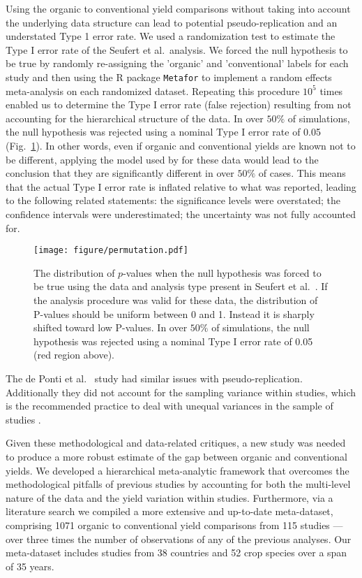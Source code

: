 \documentclass{article}\usepackage[]{graphicx}\usepackage[]{color}
\begin{document}
Using the organic to conventional yield comparisons without taking
into account the underlying data structure can lead to potential
pseudo-replication and an understated Type 1 error rate. We used a
randomization test to estimate the Type I error rate of the Seufert et
al.~analysis.  We forced the null hypothesis to be true by randomly
re-assigning the 'organic' and 'conventional' labels for each study
and then using the R package {\tt Metafor} \citep{metafor} to
implement a random effects meta-analysis on each randomized dataset.
Repeating this procedure $10^5$ times enabled us to determine the Type
I error rate (false rejection) resulting from not accounting for the
hierarchical structure of the data.  In over $50\%$ of simulations,
the null hypothesis was rejected using a nominal Type I error rate of
0.05 (Fig.~\ref{fig:permutation}).  In other words, even if organic
and conventional yields are known not to be different, applying the
model used by \cite{Seufert2012} for these data would lead to the
conclusion that they are significantly different in over $50\%$ of
cases. This means that the actual Type I error rate is inflated
relative to what was reported, leading to the following related
statements: the significance levels were overstated; the confidence
intervals were underestimated; the uncertainty was not fully accounted
for.

\begin{figure} \centering
\texttt{[image: figure/permutation.pdf]}
\caption{The distribution of $p$-values when the null hypothesis was
forced to be true using the data and analysis type present in
Seufert et al.\  \cite{Seufert2012}.  If the analysis procedure was
valid for these data, the distribution of P-values should be
uniform between 0 and 1.  Instead it is sharply shifted toward low
P-values.  In over $50\%$ of simulations, the null hypothesis was
rejected using a nominal Type I error rate of 0.05 (red region
above).}
\label{fig:permutation}
\end{figure}

The de Ponti et al.\ \citep{dePonti2012} study had similar issues with
pseudo-replication. Additionally they did not account for the sampling
variance within studies, which is the recommended practice to deal
with unequal variances in the sample of studies \citep{Gurevitch1999}.

Given these methodological and data-related critiques, a new study was
needed to produce a more robust estimate of the gap between organic
and conventional yields.  We developed a hierarchical meta-analytic
framework that overcomes the methodological pitfalls of previous
studies by accounting for both the multi-level nature of the data and
the yield variation within studies.  Furthermore, via a literature
search we compiled a more extensive and up-to-date meta-dataset,
comprising 1071 organic to conventional yield comparisons from 115
studies --- over three times the number of observations of any of the
previous analyses. Our meta-dataset includes studies from 38 countries
and 52 crop species over a span of 35 years.
\end{document}

